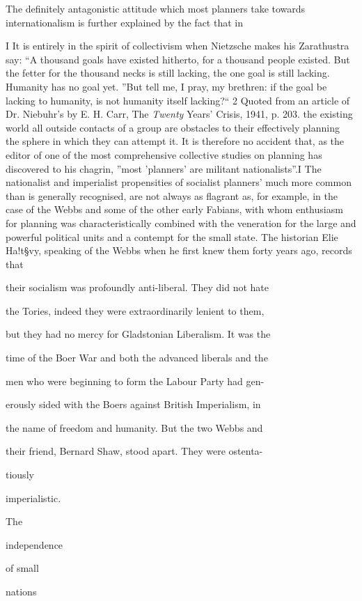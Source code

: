 \documentclass[11pt,openany]{book}
\begin{document}
The definitely antagonistic attitude which most planners take towards internationalism is further explained by the fact that in

I It is entirely in the spirit of collectivism when Nietzsche makes his Zarathustra say: ``A thousand goals have existed hitherto, for a thousand people existed. But the fetter for the thousand necks is still lacking, the one goal is still lacking. Humanity has no goal yet. ''But tell me, I pray, my brethren: if the goal be lacking to humanity, is not humanity itself lacking?`` 2 Quoted from an article of Dr. Niebuhr's by E. H. Carr, The \emph{Twenty} Years' Crisis, 1941, p. 203. the existing world all outside contacts of a group are obstacles to their effectively planning the sphere in which they can attempt it. It is therefore no accident that, as the editor of one of the most comprehensive collective studies on planning has discovered to his chagrin, ''most 'planners' are militant nationalists''.I The nationalist and imperialist propensities of socialist planners' much more common than is generally recognised, are not always as flagrant as, for example, in the case of the Webbs and some of the other early Fabians, with whom enthusiasm for planning was characteristically combined with the veneration for the large and powerful political units and a contempt for the small state. The historian Elie Ha!t§vy, speaking of the Webbs when he first knew them forty years ago, records that

their socialism was profoundly anti-liberal. They did not hate

the Tories, indeed they were extraordinarily lenient to them,

but they had no mercy for Gladstonian Liberalism. It was the

time of the Boer War and both the advanced liberals and the

men who were beginning to form the Labour Party had gen-

erously sided with the Boers against British Imperialism, in

the name of freedom and humanity. But the two Webbs and

their friend, Bernard Shaw, stood apart. They were ostenta-

tiously

imperialistic.

The

independence

of small

nations
\end{document}
